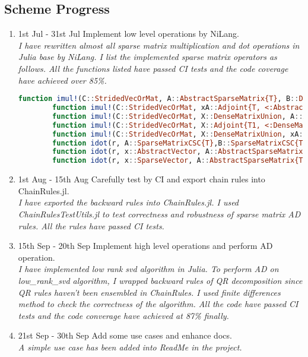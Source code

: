 \subsection{Scheme Progress}
\begin{enumerate}
    \item 1st Jul - 31st Jul \quad Implement low level operations by NiLang.  \\
    \textit{I have rewritten almost all sparse matrix multiplication and dot operations in Julia base by NiLang.  
    I list the implemented sparse matrix operators as follows. 
    All the functions listed have passed CI tests and the code coverage have achieved over 85\%.}
    \begin{lstlisting}[language=Julia]
        function imul!(C::StridedVecOrMat, A::AbstractSparseMatrix{T}, B::DenseInputVecOrMat, α::Number, β::Number) where T
        function imul!(C::StridedVecOrMat, xA::Adjoint{T, <:AbstractSparseMatrix}, B::DenseInputVecOrMat, α::Number, β::Number) where T
        function imul!(C::StridedVecOrMat, X::DenseMatrixUnion, A::AbstractSparseMatrix{T}, α::Number, β::Number) where T
        function imul!(C::StridedVecOrMat, X::Adjoint{T1, <:DenseMatrixUnion}, A::AbstractSparseMatrix{T2}, α::Number, β::Number) where {T1, T2}
        function imul!(C::StridedVecOrMat, X::DenseMatrixUnion, xA::Adjoint{T, <:AbstractSparseMatrix}, α::Number, β::Number) where T
        function idot(r, A::SparseMatrixCSC{T},B::SparseMatrixCSC{T}) where {T}
        function idot(r, x::AbstractVector, A::AbstractSparseMatrix{T1}, y::AbstractVector{T2}) where {T1, T2}
        function idot(r, x::SparseVector, A::AbstractSparseMatrix{T1}, y::SparseVector{T2}) where {T1, T2}
    \end{lstlisting}  
    \item 1st Aug - 15th Aug   \quad Carefully test by CI and export chain rules into ChainRules.jl.  \\
    \textit{I have exported the backward rules into ChainRules.jl. I used ChainRulesTestUtils.jl to test correctness and robustness of 
    sparse matrix AD rules. All the rules have passed CI tests.}
    \item 15th Sep - 20th Sep \quad  Implement high level operations and perform AD operation. \\
    \textit{I have implemented low rank svd algorithm in Julia. To perform AD on low\_rank\_svd algorithm, I wrapped backward rules of 
    QR decomposition since QR rules haven't been ensembled in ChainRules. I used finite differences method to check the correctness 
    of the algorithm. All the code have passed CI tests and the code converage have achieved at 87\% finally.}
    \item 21st Sep - 30th Sep \quad Add some use cases and enhance docs. \\
    \textit{A simple use case has been added into ReadMe in the project.}
\end{enumerate}
    
